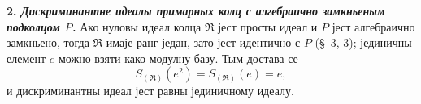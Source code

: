 \documentclass[11pt]{article}
\begin{document}
\setcounter{footnote}{27}

\textbf{2. \emph{Дискриминантне идеалы примарных колц с алгебраично замкньеным подколцом $P$.}} Ако нуловы идеал колца $\mathfrak R$ јест просты идеал и $P$ јест алгебраично замкньено, тогда $\mathfrak R$ имаје ранг један, зато јест идентично с $P$ (\S~3, 3); јединичны елемент $e$ можно взяти како модулну базу. Тым достава се
\[
        S_{(\mathfrak R)}(e^2)=S_{(\mathfrak R)}(e)=e,
\]
и дискриминантны идеал јест равны јединичному идеалу.
\end{document}
